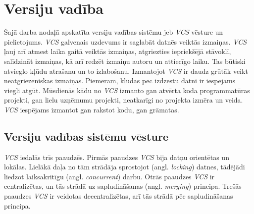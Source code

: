 \chapter{Versiju vadība}


Šajā darba nodaļā apskatīta versiju vadības sistēmu jeb \textit{VCS} vēsture un pielietojums. \textit{VCS} galvenais uzdevums ir saglabāt datnēs veiktās izmaiņas. \textit{VCS} ļauj arī atmest laika gaitā veiktās izmaiņas, atgriezties iepriekšējā stāvoklī, salīdzināt izmaiņas, kā arī redzēt izmaiņu autoru un attiecīgo laiku. Tas būtiski atvieglo kļūdu atrašanu un to izlabošanu. Izmantojot \textit{VCS} ir daudz grūtāk veikt neatgriezeniskas izmaiņas. Piemēram, kļūdas pēc izdzēstu datni ir iespējams viegli atgūt. Mūsdienās kādu no \textit{VCS} izmanto gan atvērta koda programmatūras projekti, gan lielu uzņēmumu projekti, neatkarīgi no projekta izmēra un veida. \textit{VCS} iespējams izmantot gan rakstot kodu, gan grāmatas. \cite[About Version Control]{chacon2014progit}

\section{Versiju vadības sistēmu vēsture}
\textit{VCS} iedalās trīs paaudzēs. Pirmās paaudzes \textit{VCS} bija datņu orientētas un lokālas. Lielākā daļa no tām strādāja sprostojot (angl. \textit{locking}) datnes, tādējādi liedzot laiksakritīgu (angl. \textit{concurrent}) darbu.
Otrās paaudzes \textit{VCS} ir centralizētas, un tās strādā uz sapludināšanas (angl. \textit{merging}) principa.
Trešās paaudzes \textit{VCS} ir veidotas decentralizētas, arī tās strādā pēc sapludināšanas principa.
\cite[history]{raymondVCS}
